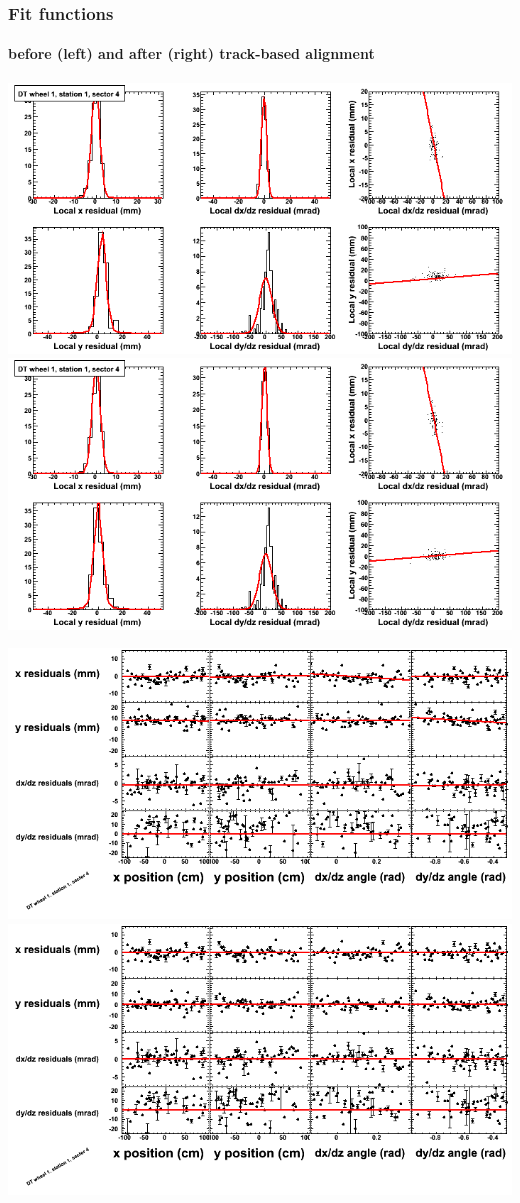 \documentclass[compress]{beamer}
\begin{document}
\begin{frame}
\frametitle{Fit functions}
\framesubtitle{before (left) and after (right) track-based alignment}
\includegraphics[width=0.5\linewidth]{fitfunctions_re01/MBwhDst1sec04_bellcurves.png} \includegraphics[width=0.5\linewidth]{fitfunctions_re05/MBwhDst1sec04_bellcurves.png}

\includegraphics[width=0.5\linewidth]{fitfunctions_re01/MBwhDst1sec04_polynomials.png} \includegraphics[width=0.5\linewidth]{fitfunctions_re05/MBwhDst1sec04_polynomials.png}
\end{frame}
\end{document}

